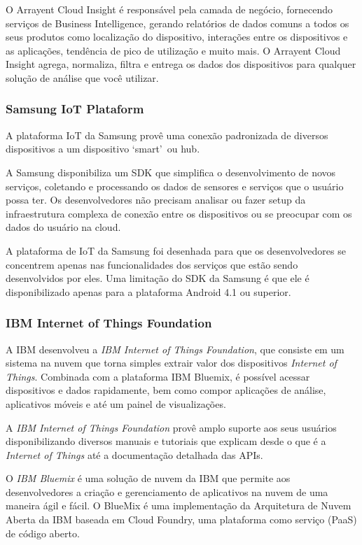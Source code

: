 O Arrayent Cloud Insight é responsável pela camada de negócio, fornecendo serviços de Business Intelligence,
gerando relatórios de dados comuns a todos os seus produtos como localização do dispositivo, interações entre
os dispositivos e as aplicações, tendência de pico de utilização e muito mais. O Arrayent Cloud Insight agrega,
normaliza, filtra e entrega os dados dos dispositivos para qualquer solução de análise que você utilizar.

\subsubsection{Samsung IoT Plataform}
A plataforma IoT da Samsung provê uma conexão padronizada de diversos dispositivos a um dispositivo
\lq smart\rq\ ou hub.

A Samsung disponibiliza um SDK que simplifica o desenvolvimento de novos serviços, coletando
e processando os dados de sensores e serviços que o usuário possa ter. Os desenvolvedores não precisam analisar ou
fazer setup da infraestrutura complexa de conexão entre os dispositivos ou se preocupar com os dados do usuário na cloud.

A plataforma de IoT da Samsung foi desenhada para que os desenvolvedores se concentrem apenas nas funcionalidades
dos serviços que estão sendo desenvolvidos por eles. Uma limitação do SDK da Samsung é que ele é disponibilizado
apenas para a plataforma Android 4.1 ou superior.

\subsubsection{IBM Internet of Things Foundation}
A IBM desenvolveu a \textit{IBM Internet of Things Foundation}, que consiste em um sistema na nuvem que torna simples
extrair valor dos dispositivos \textit{Internet of Things}. Combinada com a plataforma IBM Bluemix\texttrademark,
é possível acessar dispositivos e dados rapidamente, bem como compor aplicações de análise, aplicativos móveis 
e até um painel de visualizações.

A \textit{IBM Internet of Things Foundation} provê amplo suporte aos seus usuários
disponibilizando diversos manuais e tutoriais que explicam desde o que é a \textit{Internet of Things}
até a documentação detalhada das APIs.

O \textit{IBM Bluemix} é uma solução de nuvem da IBM que permite aos desenvolvedores a criação
e gerenciamento de aplicativos na nuvem de uma maneira ágil e fácil.
O BlueMix é uma implementação da Arquitetura de Nuvem Aberta da IBM baseada em Cloud Foundry, uma plataforma como serviço (PaaS) de código aberto.


